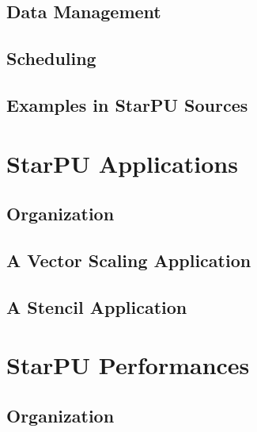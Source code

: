 \chapter{Data Management}
\label{DataManagement}
\hypertarget{DataManagement}{}


\chapter{Scheduling}
\label{Scheduling}
\hypertarget{Scheduling}{}


\chapter{Examples in StarPU Sources}
\label{ExamplesInStarPUSources}
\hypertarget{ExamplesInStarPUSources}{}


\part{StarPU Applications}
\label{StarPUApplications}

\chapter{Organization}
\label{IntroApplications}
\hypertarget{IntroApplications}{}


\chapter{A Vector Scaling Application}
\label{VectorScalingApplication}
\hypertarget{VectorApplication}{}


\chapter{A Stencil Application}
\label{StencilApplication}
\hypertarget{StencilApplication}{}


\part{StarPU Performances}

\chapter{Organization}
\label{IntroPerformances}
\hypertarget{IntroPerformances}{}


